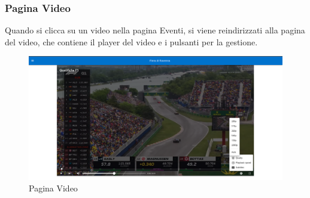 \subsubsection{Pagina Video}
Quando si clicca su un video nella pagina Eventi, si viene reindirizzati alla pagina del video, che contiene il player del video e i pulsanti per la gestione.\\
\begin{figure}[H]
    \centering
    \includegraphics[width=1\textwidth]{images/interface/video.png}
    \caption{Pagina Video}
    \label{fig:video}
\end{figure}
